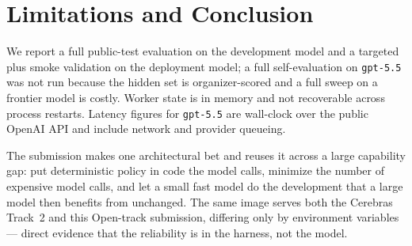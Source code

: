 \documentclass{article}
\begin{document}
\section{Limitations and Conclusion}

We report a full public-test evaluation on the development model and a targeted
plus smoke validation on the deployment model; a full self-evaluation on
\texttt{gpt-5.5} was not run because the hidden set is organizer-scored and a
full sweep on a frontier model is costly. Worker state is in memory and not
recoverable across process restarts. Latency figures for \texttt{gpt-5.5} are
wall-clock over the public OpenAI API and include network and provider queueing.

The submission makes one architectural bet and reuses it across a large
capability gap: put deterministic policy in code the model calls, minimize the
number of expensive model calls, and let a small fast model do the development
that a large model then benefits from unchanged. The same image serves both the
Cerebras Track~2 and this Open-track submission, differing only by environment
variables --- direct evidence that the reliability is in the harness, not the
model.



\end{document}

